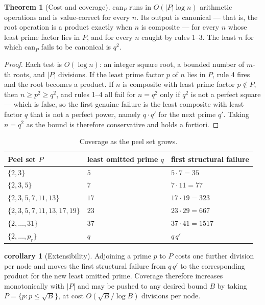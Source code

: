 \documentclass[11pt]{article}
\theoremstyle{definition}
\newtheorem{theorem}{Theorem}
\newtheorem{corollary}{corollary}
\begin{document}
\begin{theorem}[Cost and coverage]\label{thm:cheap}
$\mathrm{can}_P$ runs in $O(|P| \log n)$ arithmetic operations and is
value-correct for every $n$. Its output is canonical --- that is, the root
operation is a product exactly when $n$ is composite --- for every $n$ whose
least prime factor lies in $P$, and for every $n$ caught by rules 1--3. The
least $n$ for which $\mathrm{can}_P$ fails to be canonical is $q^2$.
\end{theorem}

\begin{proof}
Each test is $O(\log n)$: an integer square root, a bounded number of $m$-th
roots, and $|P|$ divisions. If the least prime factor $p$ of $n$ lies in $P$,
rule 4 fires and the root becomes a product. If $n$ is composite with least
prime factor $p \notin P$, then $n \ge p^2 \ge q^2$, and rules 1--4 all fail
for $n = q^2$ only if $q^2$ is not a perfect square --- which is false, so the
first genuine failure is the least composite with least factor $q$ that is not
a perfect power, namely $q \cdot q'$ for the next prime $q'$. Taking $n=q^2$
as the bound is therefore conservative and holds a fortiori.
\end{proof}

\begin{table}[htbp]
\centering
\caption{Coverage as the peel set grows.}
\begin{tabular}{lll}
\hline
Peel set $P$ & least omitted prime $q$ & first structural failure \\
\hline
$\{2,3\}$                    & $5$  & $5 \cdot 7 = 35$ \\
$\{2,3,5\}$                  & $7$  & $7 \cdot 11 = 77$ \\
$\{2,3,5,7,11,13\}$          & $17$ & $17 \cdot 19 = 323$ \\
$\{2,3,5,7,11,13,17,19\}$    & $23$ & $23 \cdot 29 = 667$ \\
$\{2,\dots,31\}$             & $37$ & $37 \cdot 41 = 1517$ \\
$\{2,\dots,p_r\}$            & $q$  & $q\,q'$ \\
\hline
\end{tabular}
\label{tab:coverage}
\end{table}

\begin{corollary}[Extensibility]
Adjoining a prime $p$ to $P$ costs one further division per node and moves the
first structural failure from $q\,q'$ to the corresponding product for the new
least omitted prime. Coverage therefore increases monotonically with $|P|$ and
may be pushed to any desired bound $B$ by taking
$P = \{p : p \le \sqrt{B}\}$, at cost $O(\sqrt{B}/\log B)$ divisions per node.
\end{corollary}
\end{document}
